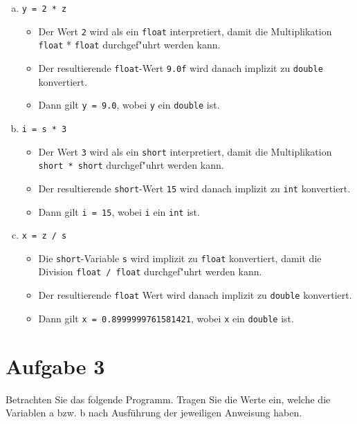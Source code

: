 \documentclass[10pt, oneside]{article}
\begin{document}
\begin{enumerate}[(a)]
    \item \verb+y = 2 * z+
        \begin{itemize}
            \item Der Wert \verb+2+ wird als ein \verb+float+ interpretiert,
                damit die Multiplikation \verb+float+ * \verb+float+
                durchgef"uhrt werden kann.
            \item Der resultierende \verb+float+-Wert \verb+9.0f+ wird danach implizit zu \verb+double+ konvertiert.
            \item Dann gilt \verb+y = 9.0+, wobei \verb+y+ ein \verb+double+ ist.
        \end{itemize}
    \item \verb+i = s * 3+ 
        \begin{itemize}
            \item Der Wert \verb+3+ wird als ein \verb+short+ interpretiert,
                damit die Multiplikation \verb+short * short+ durchgef"uhrt
                werden kann.
            \item Der resultierende \verb+short+-Wert \verb+15+ wird danach implizit zu \verb+int+ konvertiert.
            \item Dann gilt \verb+i = 15+, wobei \verb+i+ ein \verb+int+ ist.
        \end{itemize}
    \item \verb+x = z / s+
        \begin{itemize}
            \item Die \verb+short+-Variable \verb+s+ wird implizit zu
                \verb+float+ konvertiert, damit die Division \verb+float / float+ 
                durchgef"uhrt werden kann.
            \item Der resultierende \verb+float+ Wert wird danach implizit zu \verb+double+ konvertiert.
            \item Dann gilt \verb+x = 0.8999999761581421+, wobei \verb+x+ ein \verb+double+ ist.
        \end{itemize}
\end{enumerate}

\section{Aufgabe 3}

Betrachten Sie das folgende Programm. Tragen Sie die Werte ein, welche die
Variablen a bzw. b nach Ausführung der jeweiligen Anweisung haben.
\end{document}
